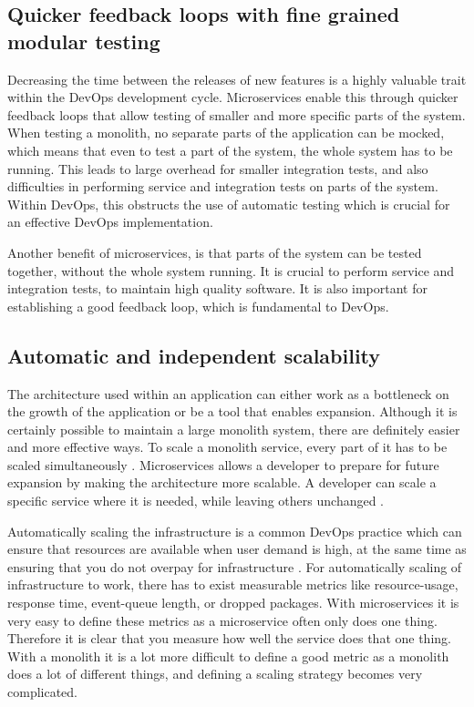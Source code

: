 \documentclass[a4paper]{article}
\begin{document}
\subsection{Quicker feedback loops with fine grained modular testing}
Decreasing the time between the releases of new features is a highly valuable trait within the DevOps development cycle. Microservices enable this through quicker feedback loops that allow testing of smaller and more specific parts of the system. When testing a monolith, no separate parts of the application can be mocked, which means that even to test a part of the system, the whole system has to be running. This leads to large overhead for smaller integration tests, and also difficulties in performing service and integration tests on parts of the system. Within DevOps, this obstructs the use of automatic testing which is crucial for an effective DevOps implementation. 

Another benefit of microservices, is that parts of the system can be tested together, without the whole system running. It is crucial to perform service and integration tests, to maintain high quality software. It is also important for establishing a good feedback loop, which is fundamental to DevOps.

\subsection{Automatic and independent scalability}
The architecture used within an application can either work as a bottleneck on the growth of the application or be a tool that enables expansion. Although it is certainly possible to maintain a large monolith system, there are definitely easier and more effective ways. To scale a monolith service, every part of it has to be scaled simultaneously \cite{Newman2015}. Microservices allows a developer to prepare for future expansion by making the architecture more scalable. A developer can scale a specific service where it is needed, while leaving others unchanged \cite{Newman2015}.

Automatically scaling the infrastructure is a common DevOps practice which can ensure that resources are available when user demand is high, at the same time as ensuring that you do not overpay for infrastructure \cite{Pinedo2015}. For automatically scaling of infrastructure to work, there has to exist measurable metrics like resource-usage, response time, event-queue length, or dropped packages. With microservices it is very easy to define these metrics as a microservice often only does one thing. Therefore it is clear that you measure how well the service does that one thing. With a monolith it is a lot more difficult to define a good metric as a monolith does a lot of different things, and defining a scaling strategy becomes very complicated.
\end{document}
